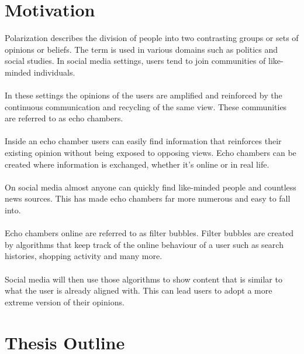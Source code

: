 \section{Motivation}
\label{sec:motivation}

Polarization describes the division of people into two contrasting groups or sets of opinions or beliefs. The term is used in various domains such as politics and social studies.
In social media settings, users tend to join communities of like-minded individuals.
\\
\\
In these settings the opinions of the users are amplified and reinforced by the continuous  communication and recycling of the same view. These communities are referred to as echo chambers.
\\
\\
Inside an echo chamber users can easily find information that reinforces their existing opinion without being exposed to opposing views.
Echo chambers can be created where information is exchanged, whether it’s online or in real life. 
\\
\\
On social media almost anyone can quickly find like-minded people and countless news sources. This has made echo chambers far more numerous and easy to fall into. 
\\
\\
Echo chambers online are referred to as filter bubbles. Filter bubbles are created by algorithms that keep track of the online behaviour of a user such as search histories, shopping activity and many more.
\\
\\
Social media will then use those algorithms to show content that is similar to what the user is already aligned with. This can lead users to adopt a more extreme version of their opinions. 


\section{Thesis Outline}
\label{sec:outline}

